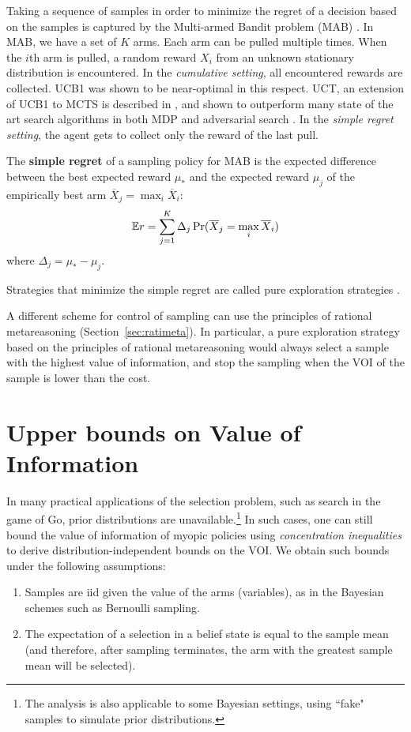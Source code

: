 Taking a sequence of samples in order to minimize the regret of a
decision based on the samples is captured by the Multi-armed Bandit
problem (MAB) \cite{Vermorel.bandits}. In MAB, we have a set of $K$
arms. Each arm can be pulled multiple times. When the $i$th arm is
pulled, a random reward $X_i$ from an unknown stationary distribution
is encountered. In the \textit{cumulative setting}, all encountered rewards are
collected.  UCB1 \cite{Auer.ucb} was shown to be
near-optimal in this respect. UCT, an extension of UCB1 to MCTS is
described in \cite{Kocsis.uct}, and shown to outperform many state of
the art search algorithms in both MDP and adversarial search
\cite{Gelly.mogo,Eyerich.ctp}. In the \textit{simple regret setting}, the agent
gets to collect only the reward of the last pull.
\begin{dfn}
The \textbf{simple regret} of a sampling policy for MAB
is the expected difference between the best expected reward
$\mu_*$ and the expected reward $\mu_j$ of the empirically best arm
$\overline X_j=\max_i\overline X_i$:
\begin{equation}
\mathbb{E} r=\sum_{j=1}^K\Delta_j\Pr(\overline X_j=\max_i\overline X_i)
\label{eqn:mcts-simple-regret}
\end{equation}
where $\Delta_j=\mu_*-\mu_j$.
\end{dfn}
Strategies that minimize the simple regret are called pure exploration
strategies \cite{Bubeck.pure}. 

A different scheme for control of sampling can use the principles of 
rational metareasoning (Section~\ref{sec:ratimeta}).
In particular, a pure exploration strategy  based on the principles of
rational metareasoning would always select a sample with the highest
value of information, and stop the sampling when the VOI of the sample
is lower than the cost.

\section{Upper bounds on Value of Information}
\label{sec:mcts-approx-nonbayesian-section}

In many practical applications of the selection problem, such as search in
the game of Go, prior distributions are unavailable.\footnote{The analysis is also applicable to
some Bayesian settings, using ``fake" samples to simulate prior distributions.}
In such cases, one can still bound
the value of information of myopic policies using {\em concentration
inequalities} to derive distribution-independent bounds on the
VOI. We obtain such bounds under the
following assumptions:
\begin{enumerate}
\item Samples are iid given the value of the arms (variables), as in the Bayesian schemes such as Bernoulli
sampling.
\item The expectation of a selection in a belief state is equal to the sample mean (and therefore,
   after sampling terminates, the arm with the greatest sample mean will be selected).
\end{enumerate}

